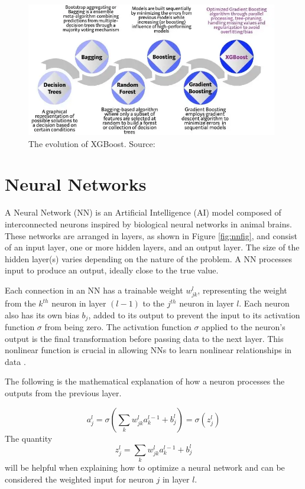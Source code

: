 \begin{figure}[H]
    \centering
    \includegraphics[width=0.98\textwidth]{Other figures/evolution_of_xgb.png}
    \caption[Evolution of XGBoost]{The evolution of XGBoost. Source: \cite{mordevishal}}
    \label{fig:evolution_of_xgb}
\end{figure}

\section{Neural Networks}\label{sec:nns}
A Neural Network (NN) is an Artificial Intelligence (AI) model composed of interconnected neurons inspired by biological neural networks in animal brains.
These networks are arranged in layers, as shown in Figure \ref{fig:nnfig}, and consist of an input layer, one or more hidden layers, and an output layer.
The size of the hidden layer(s) varies depending on the nature of the problem.
A NN processes input to produce an output, ideally close to the true value.

Each connection in an NN has a trainable weight $w_{jk}^l$, representing the weight from the $k^{th}$ neuron in layer $(l-1)$ to the $j^{th}$ neuron in layer $l$.
Each neuron also has its own bias $b_j$, added to its output to prevent the input to its activation function $\sigma$ from being zero.
The activation function $\sigma$ applied to the neuron's output is the final transformation before passing data to the next layer.
This nonlinear function is crucial in allowing NNs to learn nonlinear relationships in data \cite{universalapproximation}.

The following is the mathematical explanation of how a neuron processes the outputs from the previous layer.

\begin{equation} \label{eq:act_neuron}
    a_{j}^l = \sigma\left(\sum_k w_{jk}^l a^{l-1}_k+b_j^l \right) = \sigma(z_j^l)
\end{equation}
The quantity 
\begin{equation}\label{eq:z_neuron}
    z_j^l = \sum_{k} w_{jk}^l a^{l-1}_k+b_j^l
\end{equation}
will be helpful when explaining how to optimize a neural network and can be considered the weighted input for neuron $j$ in layer $l$.


